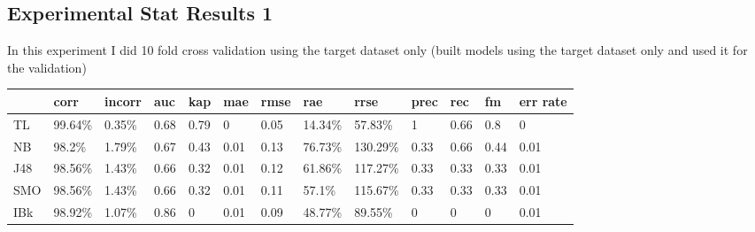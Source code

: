 \documentclass[a4paper,12pt, english]{article}
\begin{document}
\subsection{Experimental Stat Results 1}
In this experiment I did 10 fold cross validation using the target dataset only (built models using the target dataset only and used it for the validation)
\begin{small}
\begin{center}
    \begin{tabular}{ | l | l | l | l | l | l | l | l | l | l | l | l | l |}
    \hline
      & corr & incorr  & auc & kap & mae & rmse & rae & rrse & prec & rec & fm & err rate\\ \hline
      TL  & 99.64\% & 0.35\% & 0.68 & 0.79 & 0 & 0.05 & 14.34\% & 57.83\% & 1 & 0.66 & 0.8 & 0\\ \hline
      NB  & 98.2\% & 1.79\% & 0.67 & 0.43 & 0.01 & 0.13 & 76.73\% & 130.29\% & 0.33 & 0.66 & 0.44 & 0.01\\ \hline
      J48 & 98.56\% & 1.43\% & 0.66 & 0.32 & 0.01 & 0.12 & 61.86\% & 117.27\% & 0.33 & 0.33 & 0.33 & 0.01\\ \hline
      SMO & 98.56\% & 1.43\% & 0.66 & 0.32 & 0.01 & 0.11 & 57.1\% & 115.67\% & 0.33 & 0.33 & 0.33 & 0.01\\ \hline
      IBk & 98.92\% & 1.07\% & 0.86 & 0 & 0.01 & 0.09 & 48.77\% & 89.55\% & 0 & 0 & 0 & 0.01\\ \hline

    
    
    \end{tabular}       
\end{center}
\end{small}
\end{document}
